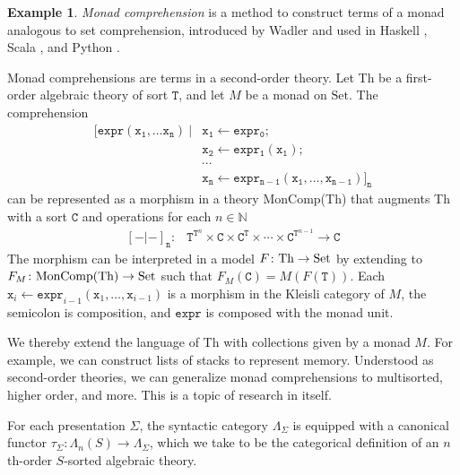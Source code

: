 \documentclass[conference]{IEEEtran}
\theoremstyle{definition}
\newtheorem{example}[theorem]{Example}
\newcommand{\mbb}[1]{\mathbb{#1}}
\newcommand{\mrm}[1]{\mathrm{#1}}
\newcommand{\mtt}[1]{\mathtt{#1}}
\newcommand{\Set}{\mrm{Set}}
\newcommand{\ttC}{\mtt{C}}
\newcommand{\ttt}{\mtt{T}}
\begin{document}
\begin{example}
    \textit{Monad comprehension} is a method to construct terms of a monad analogous to set comprehension, introduced by Wadler \cite{WadlerComprehendingMonads}and used in Haskell \cite{HaskellDo},
    Scala \cite{ScalaFor}, and Python \cite{PythonList}.
    
    Monad comprehensions are terms in a second-order theory. Let Th be a first-order algebraic theory of sort $\ttt$, and let $M$ be a monad on $\Set$. The comprehension
    \[\begin{array}{rl}
    \mtt{[expr(x_1, \ldots x_n)~|}&\mtt{x_1 \leftarrow expr_0;}\\
    &\mtt{x_2 \leftarrow expr_1(x_1);}\\
    &\mtt{\cdots}\\
    &\mtt{x_n \leftarrow expr_{n-1}(x_1, \ldots, x_{n-1})]_{n}}
    \end{array}\]
    can be represented as a morphism in a theory MonComp(Th) that augments Th with a sort $\ttC$ and operations for each $n \in \mbb{N}$
    \[\begin{array}{rl}
    \mtt{[-|-]_{n}}:&\ttt^{\ttt^n} \times \ttC \times \ttC^{\ttt} \times \cdots \times \ttC^{\ttt^{n-1}} \to \ttC
    \end{array}\]
    The morphism can be interpreted in a model $F\colon {\rm Th} \to {\rm Set}$ by extending to $F_M\colon {\rm MonComp(Th)} \to {\rm Set}$ such that $F_M(\mtt{C}) = M(F(\ttt))$.  Each $\mtt{x}_i \leftarrow \mtt{expr}_{i-1}(\mtt{x}_1, \ldots, \mtt{x}_{i-1})$ is a morphism in the Kleisli category of $M$, the semicolon is composition, and $\mtt{expr}$ is composed with the monad unit.
    
    We thereby extend the language of Th with collections given by a monad $M$. For example, we can construct lists of stacks to represent memory. Understood as second-order theories, we can generalize monad comprehensions to multisorted, higher order, and more. This is a topic of research in itself.
    
\end{example}

For each presentation $\Sigma$, the syntactic category $\Lambda_\Sigma$ is equipped with a canonical functor $\tau_\Sigma:\Lambda_n(S)\to \Lambda_\Sigma$, which we take to be the categorical definition of an $n$th-order $S$-sorted algebraic theory.
\end{document}
